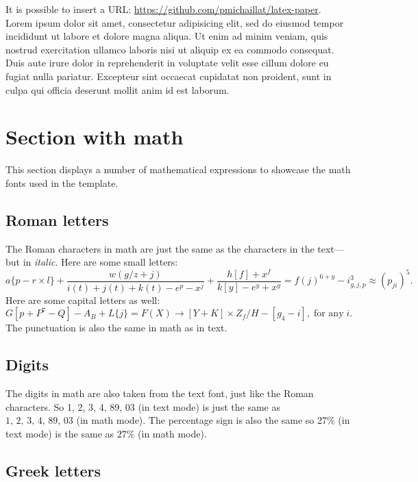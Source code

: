\documentclass[letterpaper,11pt,leqno]{article}
\begin{document}
It is possible to insert a URL: \url{https://github.com/pmichaillat/latex-paper}. Lorem ipsum dolor sit amet, consectetur adipisicing elit, sed do eiusmod
tempor incididunt ut labore et dolore magna aliqua. Ut enim ad minim veniam,
quis nostrud exercitation ullamco laboris nisi ut aliquip ex ea commodo
consequat. Duis aute irure dolor in reprehenderit in voluptate velit esse
cillum dolore eu fugiat nulla pariatur. Excepteur sint occaecat cupidatat non
proident, sunt in culpa qui officia deserunt mollit anim id est laborum.

\section{Section with math}\label{s:math}

This section displays a number of mathematical expressions to showcase the math fonts used in the template.

\subsection{Roman letters} 

The Roman characters in math are just the same as the characters in the text---but in \textit{italic}. Here are some small letters: 
\begin{equation*}
a\{p - r \times l\} + \frac{w(g/z+j)}{i(t)+j(t)+k(t) - e^p - x^j} + \frac{h[f]+x^f}{k[y]-e^y + x^y} = f(j)^{6+y} - i^3_{g,j,p} \approx (p_{ji})^5.
\end{equation*}
Here are some capital letters as well: 
\begin{equation*}
G[p + P^7-Q] - A_B + L\{j\} = F(X) \to [Y+K]\times Z_f/H - [g_4 - i],\;\text{for any}\;i.
\end{equation*}
The punctuation is also the same in math as in text. 

\subsection{Digits} 

The digits in math are also taken from the text font, just like the Roman characters. So 1, 2, 3, 4, 89, 03 (in text mode) is just the same as $1,\,2,\,3,\,4,\,89,\,03$ (in math mode). The percentage sign is also the same so 27\% (in text mode) is the same as $27\%$ (in math mode).

\subsection{Greek letters}
\end{document}
